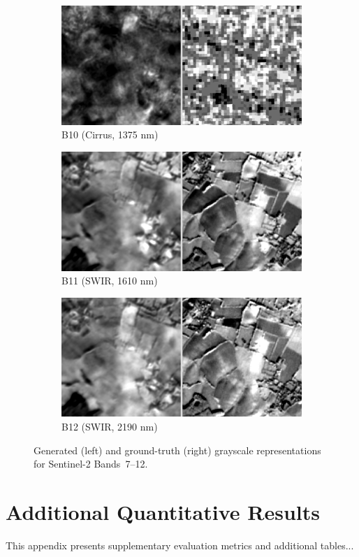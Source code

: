 \begin{figure}[p]
    \vspace{0.5em}
    \begin{subfigure}{0.48\textwidth}
        \centering
        \includegraphics[width=\linewidth]{img/bands_gray/sample_000008_B11_panel.png}
        \caption{B10 (Cirrus, 1375 nm)}
    \end{subfigure}\hfill
    \begin{subfigure}{0.48\textwidth}
        \centering
        \includegraphics[width=\linewidth]{img/bands_gray/sample_000008_B12_panel.png}
        \caption{B11 (SWIR, 1610 nm)}
    \end{subfigure}

    \vspace{0.5em}
    \begin{subfigure}{0.48\textwidth}
        \centering
        \includegraphics[width=\linewidth]{img/bands_gray/sample_000008_B13_panel.png}
        \caption{B12 (SWIR, 2190 nm)}
    \end{subfigure}

    \caption[Bandwise grayscale reconstructions (Bands 7–12)]%
    {Generated (left) and ground-truth (right) grayscale representations for Sentinel-2 Bands~7–12.}
\end{figure}


\chapter{Additional Quantitative Results}
\label{appendix:quantitative}
This appendix presents supplementary evaluation metrics and additional tables...
